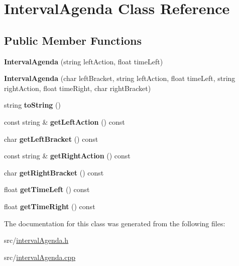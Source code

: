 \hypertarget{classIntervalAgenda}{\section{Interval\+Agenda Class Reference}
\label{classIntervalAgenda}
}
\subsection*{Public Member Functions}
\begin{DoxyCompactItemize}
\item 
\hypertarget{classIntervalAgenda_aaad87361ecf117b0c2a16d57162aff02}{{\bfseries Interval\+Agenda} (string left\+Action, float time\+Left)}\label{classIntervalAgenda_aaad87361ecf117b0c2a16d57162aff02}

\item 
\hypertarget{classIntervalAgenda_a37752a10d11394950d4bf1e1c7c69ba1}{{\bfseries Interval\+Agenda} (char left\+Bracket, string left\+Action, float time\+Left, string right\+Action, float time\+Right, char right\+Bracket)}\label{classIntervalAgenda_a37752a10d11394950d4bf1e1c7c69ba1}

\item 
\hypertarget{classIntervalAgenda_a425dd6f517bceb0ca2e22a6cbf9c3625}{string {\bfseries to\+String} ()}\label{classIntervalAgenda_a425dd6f517bceb0ca2e22a6cbf9c3625}

\item 
\hypertarget{classIntervalAgenda_a6cc17546d3186f1dddc14650474b5ec9}{const string \& {\bfseries get\+Left\+Action} () const }\label{classIntervalAgenda_a6cc17546d3186f1dddc14650474b5ec9}

\item 
\hypertarget{classIntervalAgenda_abd677658bc8f055e0766dca6e5f78a50}{char {\bfseries get\+Left\+Bracket} () const }\label{classIntervalAgenda_abd677658bc8f055e0766dca6e5f78a50}

\item 
\hypertarget{classIntervalAgenda_aaddff42cb1a253fa8365dc7737bdd11a}{const string \& {\bfseries get\+Right\+Action} () const }\label{classIntervalAgenda_aaddff42cb1a253fa8365dc7737bdd11a}

\item 
\hypertarget{classIntervalAgenda_a1accffd290ef1a2a6a90b41e88eac5db}{char {\bfseries get\+Right\+Bracket} () const }\label{classIntervalAgenda_a1accffd290ef1a2a6a90b41e88eac5db}

\item 
\hypertarget{classIntervalAgenda_a1270a16e0277a905701df2d51f9df421}{float {\bfseries get\+Time\+Left} () const }\label{classIntervalAgenda_a1270a16e0277a905701df2d51f9df421}

\item 
\hypertarget{classIntervalAgenda_a898b517bbf0a26452278bdea9d6fdb0d}{float {\bfseries get\+Time\+Right} () const }\label{classIntervalAgenda_a898b517bbf0a26452278bdea9d6fdb0d}

\end{DoxyCompactItemize}


The documentation for this class was generated from the following files\+:\begin{DoxyCompactItemize}
\item 
src/\hyperlink{intervalAgenda_8h}{interval\+Agenda.\+h}\item 
src/\hyperlink{intervalAgenda_8cpp}{interval\+Agenda.\+cpp}\end{DoxyCompactItemize}
